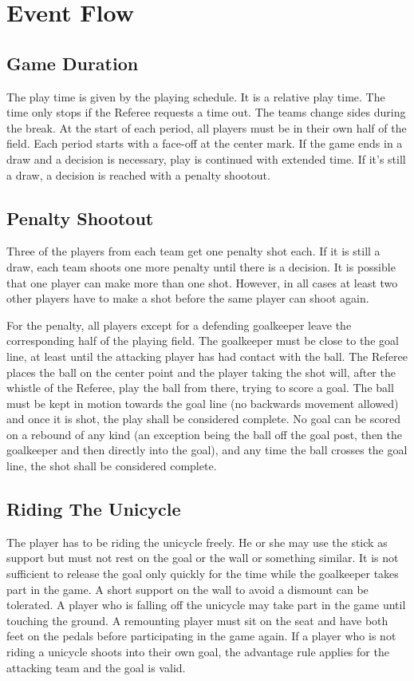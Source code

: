 \section{Event Flow}

\subsection{Game Duration}

The play time is given by the playing schedule.
It is a relative play time.
The time only stops if the Referee requests a time out.
The teams change sides during the break.
At the start of each period, all players must be in their own half of the field.
Each period starts with a face-off at the center mark.
If the game ends in a draw and a decision is necessary, play is continued with extended time.
If it's still a draw, a decision is reached with a penalty shootout.

\subsection{Penalty Shootout}
Three of the players from each team get one penalty shot each.
If it is still a draw, each team shoots one more penalty until there is a decision.
It is possible that one player can make more than one shot.
However, in all cases at least two other players have to make a shot before the same player can shoot again.

For the penalty, all players except for a defending goalkeeper leave the corresponding half of the playing field.
The goalkeeper must be close to the goal line, at least until the attacking player has had contact with the ball.
The Referee places the ball on the center point and the player taking the shot will, after the whistle of the Referee, play the ball from there, trying to score a goal.
The ball must be kept in motion towards the goal line (no backwards movement allowed) and once it is shot, the play shall be considered complete.
No goal can be scored on a rebound of any kind (an exception being the ball off the goal post, then the goalkeeper and then directly into the goal), and any time the ball crosses the goal line, the shot shall be considered complete.

\subsection{Riding The Unicycle}
The player has to be riding the unicycle freely.
He or she may use the stick as support but must not rest on the goal or the wall or something similar.
It is not sufficient to release the goal only quickly for the time while the goalkeeper takes part in the game.
A short support on the wall to avoid a dismount can be tolerated.
A player who is falling off the unicycle may take part in the game until touching the ground.
A remounting player must sit on the seat and have both feet on the pedals before participating in the game again.
If a player who is not riding a unicycle shoots into their own goal, the advantage rule applies for the attacking team and the goal is valid.

